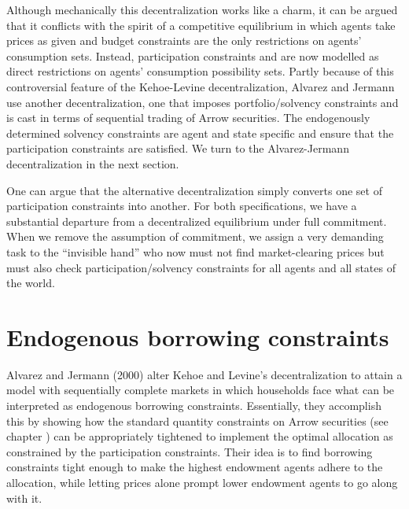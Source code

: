   Although mechanically this decentralization  works like a charm, it
can
be argued that it conflicts with the
spirit of a competitive equilibrium in which agents take prices
as given and budget constraints are the only restrictions on agents'
consumption sets. Instead,
participation constraints  and 
are now modelled as direct restrictions on agents' consumption possibility sets.
Partly because of this controversial feature of the
Kehoe-Levine decentralization,
Alvarez and Jermann use another  decentralization, one that
imposes portfolio/solvency constraints and is cast in terms of sequential
trading of Arrow securities.
%
The endogenously determined solvency constraints are agent and
state specific and ensure that the participation constraints are
satisfied. We turn to the Alvarez-Jermann decentralization in the next section.


One can argue that the alternative decentralization simply
converts one set of participation constraints into another.
For both specifications, we have a substantial departure from a decentralized
equilibrium under full commitment. When we
remove the assumption of commitment, we assign a very demanding
task to the ``invisible hand'' who now must not find market-clearing
prices but must also check participation/solvency
constraints for all agents and all states of the world.


\section{Endogenous borrowing constraints}
Alvarez and Jermann (2000) alter Kehoe and Levine's
decentralization to attain a model with sequentially complete
markets in which households face what can be interpreted as
endogenous borrowing constraints.
%
Essentially, they accomplish this by showing how the standard
quantity constraints on Arrow securities (see chapter
) can be appropriately tightened  to implement the
optimal allocation as constrained by the participation
constraints.  Their idea is to find borrowing constraints tight
enough to make the highest endowment agents adhere to the
allocation, while letting prices alone prompt lower endowment
agents to go along with it.   

